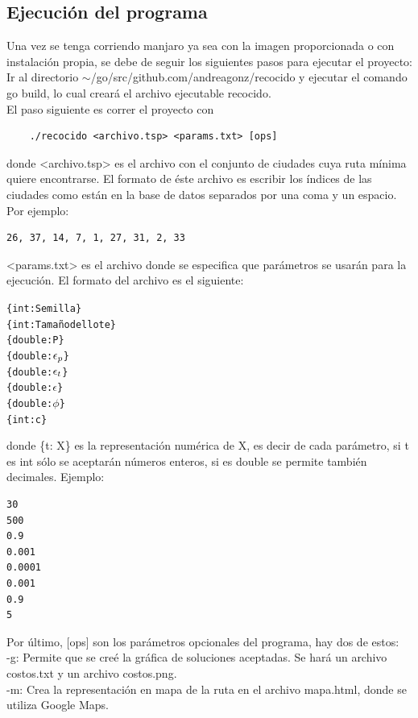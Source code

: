 \documentclass[12pt]{article}
\begin{document}
\subsection{Ejecución del programa}

Una vez se tenga corriendo manjaro ya sea con la imagen proporcionada o con instalación propia, se debe de seguir los siguientes pasos para ejecutar el proyecto: \\

Ir al directorio \textsf{$\sim$/go/src/github.com/andreagonz/recocido} y ejecutar el comando \textsf{go build}, lo cual creará el archivo ejecutable \textsf{recocido}. \\

El paso siguiente es correr el proyecto con
\begin{verbatim}
    ./recocido <archivo.tsp> <params.txt> [ops]
\end{verbatim}
donde \textsf{<archivo.tsp>} es el archivo con el conjunto de ciudades cuya ruta mínima quiere encontrarse. El formato de éste archivo es escribir los índices de las ciudades como están en la base de datos separados por una coma y un espacio. Por ejemplo:
\begin{verbatim}
26, 37, 14, 7, 1, 27, 31, 2, 33
\end{verbatim}
\textsf{<params.txt>} es el archivo donde se especifica que parámetros se usarán para la ejecución. El formato del archivo es el siguiente:
\begin{alltt}
\{int: Semilla\}
\{int: Tamaño del lote\}
\{double: P\}
\{double: \(\epsilon\sb{p}\)\}
\{double: \(\epsilon\sb{t}\)\}
\{double: \(\epsilon\)\}
\{double: \(\phi\)\}
\{int: c\}
\end{alltt}
donde \textsf{\{t: X\}} es la representación numérica de \textsf{X}, es decir de cada parámetro, si \textsf{t} es \textsf{int} sólo se aceptarán números enteros, si es \textsf{double} se permite también decimales. Ejemplo:
\begin{verbatim}
30
500
0.9
0.001
0.0001
0.001
0.9
5
\end{verbatim}
Por último, \textsf{[ops]} son los parámetros opcionales del programa, hay dos de estos: \\

\textsf{-g}: Permite que se creé la gráfica de soluciones aceptadas. Se hará un archivo \textsf{costos.txt} y un archivo \textsf{costos.png}. \\

\textsf{-m}: Crea la representación en mapa de la ruta en el archivo \textsf{mapa.html}, donde se utiliza Google Maps. \\
\end{document}

